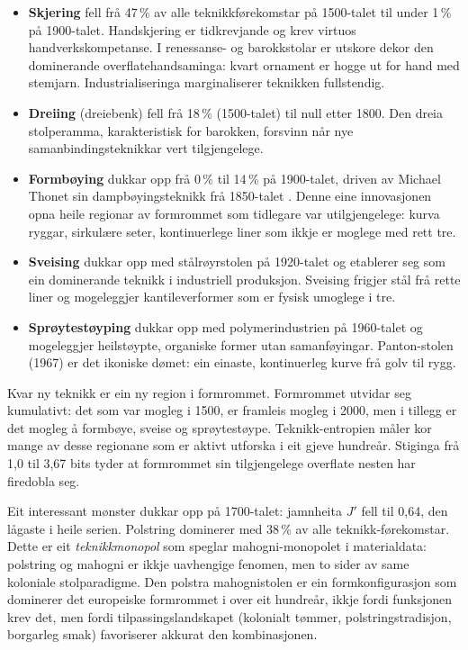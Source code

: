 \documentclass[10pt, a4paper, twocolumn]{article}
\begin{document}
\begin{itemize}
  \item \textbf{Skjering} fell frå 47\,\% av alle teknikkførekomstar på 1500-talet til under 1\,\% på 1900-talet. Handskjering er tidkrevjande og krev virtuos handverkskompetanse. I renessanse- og barokkstolar er utskore dekor den dominerande overflatehandsaminga: kvart ornament er hogge ut for hand med stemjarn. Industrialiseringa marginaliserer teknikken fullstendig.

  \item \textbf{Dreiing} (dreiebenk) fell frå 18\,\% (1500-talet) til null etter 1800. Den dreia stolperamma, karakteristisk for barokken, forsvinn når nye samanbindingsteknikkar vert tilgjengelege.

  \item \textbf{Formbøying} dukkar opp frå 0\,\% til 14\,\% på 1900-talet, driven av Michael Thonet sin dampbøyingsteknikk frå 1850-talet \citep{thonet1976}. Denne eine innovasjonen opna heile regionar av formrommet som tidlegare var utilgjengelege: kurva ryggar, sirkulære seter, kontinuerlege liner som ikkje er moglege med rett tre.

  \item \textbf{Sveising} dukkar opp med stålrøyrstolen på 1920-talet og etablerer seg som ein dominerande teknikk i industriell produksjon. Sveising frigjer stål frå rette liner og mogeleggjer kantileverformer som er fysisk umoglege i tre.

  \item \textbf{Sprøytestøyping} dukkar opp med polymerindustrien på 1960-talet og mogeleggjer heilstøypte, organiske former utan samanføyingar. Panton-stolen (1967) er det ikoniske dømet: ein einaste, kontinuerleg kurve frå golv til rygg.
\end{itemize}

Kvar ny teknikk er ein ny region i formrommet. Formrommet utvidar seg kumulativt: det som var mogleg i 1500, er framleis mogleg i 2000, men i tillegg er det mogleg å formbøye, sveise og sprøytestøype. Teknikk-entropien måler kor mange av desse regionane som er aktivt utforska i eit gjeve hundreår. Stiginga frå 1,0 til 3,67 bits tyder at formrommet sin tilgjengelege overflate nesten har firedobla seg.

Eit interessant mønster dukkar opp på 1700-talet: jamnheita $J'$ fell til 0,64, den lågaste i heile serien. Polstring dominerer med 38\,\% av alle teknikk-førekomstar. Dette er eit \emph{teknikkmonopol} som speglar mahogni-monopolet i materialdata: polstring og mahogni er ikkje uavhengige fenomen, men to sider av same koloniale stolparadigme. Den polstra mahognistolen er ein formkonfigurasjon som dominerer det europeiske formrommet i over eit hundreår, ikkje fordi funksjonen krev det, men fordi tilpassingslandskapet (kolonialt tømmer, polstringstradisjon, borgarleg smak) favoriserer akkurat den kombinasjonen.
\end{document}
